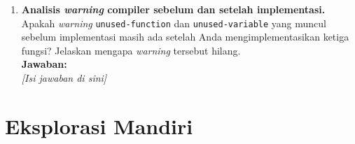 \begin{enumerate}
    \item \textbf{Analisis \textit{warning} compiler sebelum dan setelah
    implementasi.}\\
    Apakah \textit{warning} \texttt{unused-function} dan
    \texttt{unused-variable} yang muncul sebelum implementasi masih
    ada setelah Anda mengimplementasikan ketiga fungsi? Jelaskan
    mengapa \textit{warning} tersebut hilang.\\[0.3cm]
    \textbf{Jawaban:}\\
    \textit{[Isi jawaban di sini]}

\end{enumerate}

\section{Eksplorasi Mandiri}

